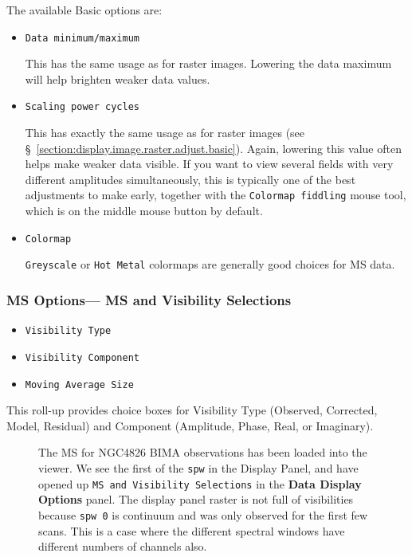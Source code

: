 The available Basic options are:

\begin{itemize}

\item {\tt Data minimum/maximum}

This has the same usage as for raster images.  
Lowering the data maximum will help brighten
weaker data values.

\item {\tt Scaling power cycles}

This has exactly the same usage as for raster images (see
\S~\ref{section:display.image.raster.adjust.basic}).  Again, lowering
this value often helps make weaker data visible.  If you want to view
several fields with very different amplitudes simultaneously, this is
typically one of the best adjustments to make early, together with the
{\tt Colormap fiddling} mouse tool, which is on the middle mouse button
by default.

\item {\tt Colormap}

{\tt Greyscale} or {\tt Hot Metal} colormaps are generally good choices
for MS data.

\end{itemize}



\subsubsection{MS Options--- MS and Visibility Selections}
\label{section:display.ms.adjust.select}

\begin{itemize}

\item {\tt Visibility Type}

\item {\tt Visibility Component}

\item {\tt Moving Average Size}

\end{itemize}

This roll-up provides choice boxes for Visibility Type
(Observed, Corrected, Model, Residual) and Component (Amplitude,
Phase, Real, or Imaginary).  

\begin{figure}[h!]
\begin{center}
\caption{\label{fig:viewer_axes_1} The MS for NGC4826 BIMA
observations has been loaded into the viewer.  We see the
first of the {\tt spw} in the Display Panel, and have opened
up {\tt MS and Visibility Selections} in the
{\bf Data Display Options} panel.  The display panel raster is
not full of visibilities because {\tt spw 0} is continuum and
was only observed for the first few scans.  This is a case where
the different spectral windows have different numbers of channels
also.}
\hrulefill
\end{center}
\end{figure}

